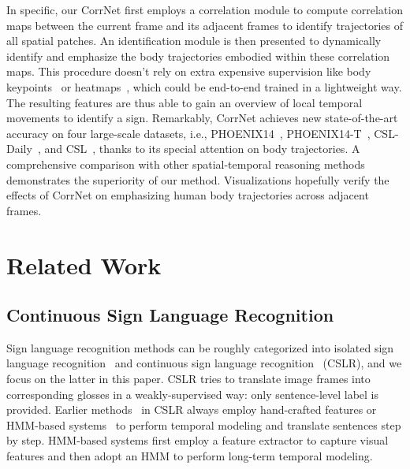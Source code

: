 \documentclass[10pt,twocolumn,letterpaper]{article}
\begin{document}
In specific, our CorrNet first employs a correlation module to compute correlation maps between the current frame and its adjacent frames to identify trajectories of all spatial patches. An identification module is then presented to dynamically identify and emphasize the body trajectories embodied within these correlation maps. This procedure doesn't rely on extra expensive supervision like body keypoints~\cite{zhou2020spatial} or heatmaps~\cite{zuo2022c2slr},  which could be end-to-end trained in a lightweight way. The resulting features are thus able to gain an overview of local temporal movements to identify a sign. Remarkably, CorrNet achieves new state-of-the-art accuracy on four large-scale datasets, i.e., PHOENIX14~\cite{koller2015continuous}, PHOENIX14-T~\cite{camgoz2018neural}, CSL-Daily~\cite{zhou2021improving}, and CSL~\cite{huang2018video}, thanks to its special attention on body trajectories. A comprehensive comparison with other spatial-temporal reasoning methods demonstrates the superiority of our method. Visualizations hopefully verify the effects of CorrNet on emphasizing human body trajectories across adjacent frames.

\section{Related Work}
\subsection{Continuous Sign Language Recognition}
Sign language recognition methods can be roughly categorized into isolated sign language recognition~\cite{tunga2021pose,hu2021signbert,hu2021hand} and continuous sign language recognition~\cite{pu2019iterative,cheng2020fully,cui2019deep,niu2020stochastic,Min_2021_ICCV} (CSLR), and we focus on the latter in this paper. CSLR tries to translate image frames into corresponding glosses in a weakly-supervised way: only sentence-level label is provided. Earlier methods~\cite{gao2004chinese,freeman1995orientation} in CSLR always employ hand-crafted features or HMM-based systems~\cite{koller2016deepsign,han2009modelling,koller2017re,koller2015continuous} to perform temporal modeling and translate sentences step by step. HMM-based systems first employ a feature extractor to capture visual features and then adopt an HMM to perform long-term temporal modeling. 
\end{document}
